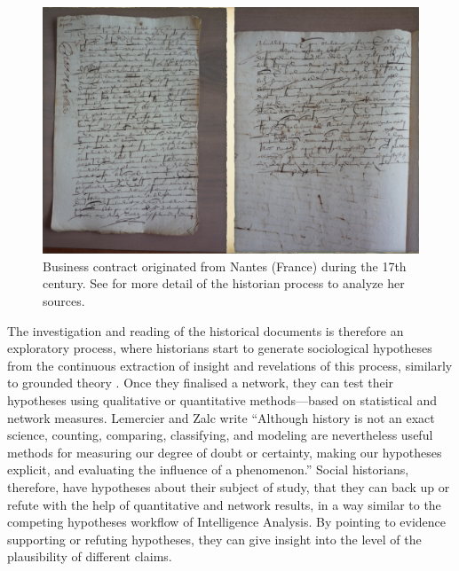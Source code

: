 \begin{figure}[!ht]
    \centering %
    \includegraphics[width=1\textwidth]{static/figures/MarieBoucher}
    \caption{Business contract originated from Nantes (France) during the 17th century. See \cite{dufournaudCommentRendreVisible2018} for more detail of the historian process to analyze her sources.}
    \label{fig:intro-MarieBoucher}
\end{figure}

The investigation and reading of the historical documents is therefore an exploratory process, where historians start to generate sociological hypotheses from the continuous extraction of insight and revelations of this process, similarly to grounded theory \cite{glaserDiscoveryGroundedTheory2010}.
Once they finalised a network, they can test their hypotheses using qualitative or quantitative methods---based on statistical and network measures.
Lemercier and Zalc write ``Although history is not an exact science, counting, comparing, classifying, and modeling are nevertheless useful methods for measuring our degree of doubt or certainty, making our hypotheses explicit, and evaluating the influence of a phenomenon.''\cite{lemercierQuantitativeMethodsHumanities2019}
Social historians, therefore, have hypotheses about their subject of study, that they can back up or refute with the help of quantitative and network results, in a way similar to the competing hypotheses workflow of Intelligence Analysis\cite{dhamiAnalysisCompetingHypotheses2019}.
By pointing to evidence supporting or refuting hypotheses, they can give insight into the level of the plausibility of different claims.





